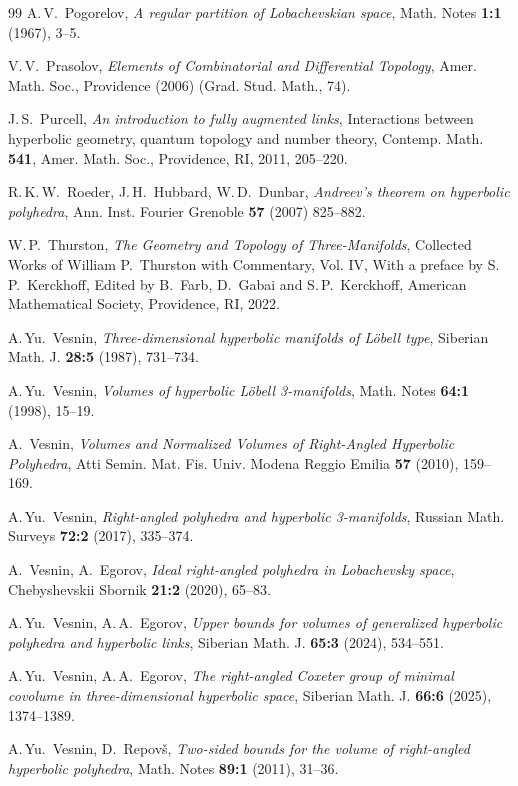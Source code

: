 \documentclass{amsart}
\begin{document}
\begin{thebibliography}{99}
 A.\,V.~Pogorelov, \textit{A regular partition of Lobachevskian space}, Math. Notes \textbf{1:1} (1967), 3--5.

V.\,V.~Prasolov, \textit{Elements of Combinatorial and Differential Topology}, Amer. Math. Soc., Providence (2006) (Grad. Stud. Math., 74).

J.\,S.~Purcell, \textit{An introduction to fully augmented links}, Interactions between hyperbolic geometry, quantum topology and number theory, Contemp. Math. \textbf{541}, Amer. Math. Soc., Providence, RI, 2011, 205--220.

R.\,K.\,W.~Roeder, J.\,H.~Hubbard, W.\,D.~Dunbar, \textit{Andreev's theorem on hyperbolic polyhedra}, Ann. Inst. Fourier Grenoble \textbf{57} (2007) 825--882. 

W.\,P.~Thurston,
\textit{The Geometry and Topology of Three-Manifolds},
Collected Works of William P.~Thurston with Commentary, Vol. IV,
With a preface by S.\,P.~Kerckhoff,
Edited by B.~Farb, D.~Gabai and S.\,P.~Kerckhoff,
American Mathematical Society, Providence, RI, 2022.

A.\,Yu.~Vesnin, \textit{Three-dimensional hyperbolic manifolds of L\"obell type}, Siberian Math. J. \textbf{28:5} (1987), 731--734.

A.\,Yu.~Vesnin, \textit{Volumes of hyperbolic L\"obell 3-manifolds}, 
Math. Notes \textbf{64:1} (1998), 15--19.

A.~Vesnin, \textit{Volumes and Normalized Volumes of Right-Angled Hyperbolic Polyhedra},
Atti Semin. Mat. Fis. Univ. Modena Reggio Emilia \textbf{57} (2010), 159--169.

A.\,Yu.~Vesnin, \textit{Right-angled polyhedra and hyperbolic 3-manifolds}, Russian Math. Surveys \textbf{72:2} (2017), 335--374.

A.~Vesnin, A.~Egorov, \textit{Ideal right-angled polyhedra in Lobachevsky space}, Chebyshevskii Sbornik
\textbf{21:2} (2020), 65--83.

A.\,Yu.~Vesnin, A.\,A.~Egorov, \textit{Upper bounds for volumes of generalized hyperbolic polyhedra and hyperbolic links}, Siberian Math. J. \textbf{65:3} (2024), 534--551.

A.\,Yu.~Vesnin, A.\,A.~Egorov, \textit{The right-angled Coxeter group of minimal covolume in three-dimensional hyperbolic space}, Siberian Math. J. \textbf{66:6} (2025), 1374--1389.

A.\,Yu.~Vesnin, D.~Repov\v{s}, \textit{Two-sided bounds for the volume of right-angled hyperbolic polyhedra}, Math. Notes \textbf{89:1} (2011), 31--36.

\end{thebibliography}
\end{document}
